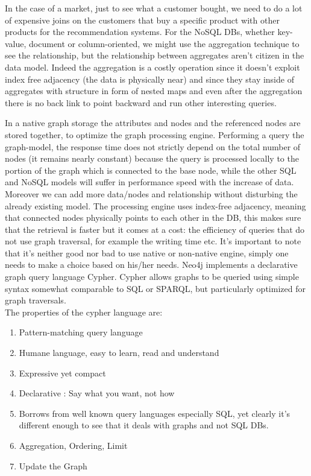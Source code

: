 \documentclass[a4page, 11pt]{article}
\begin{document}
In the case of a market, just to see what a customer bought, we need to do a lot of expensive joins on the customers that buy a specific product with other products for the recommendation systems. 
For the NoSQL DBs, whether key-value, document or column-oriented, we might use the aggregation technique to see the relationship, but the relationship between aggregates aren't citizen in the data model. Indeed the aggregation is a costly operation since it doesn't exploit index free adjacency (the data is physically near) and since they stay inside of aggregates with structure in form of nested maps and even after the aggregation there is no back link to point backward and run
other interesting queries. 

In a native graph storage the attributes and nodes and the referenced nodes are stored together, to optimize the graph processing engine. 
Performing a query the graph-model, the response time does not strictly depend on the total number of nodes (it remains nearly constant) because the query is processed locally to the portion of the graph which is connected to the base node, while the other SQL and NoSQL models will suffer in performance speed with the increase of data. 
Moreover we can add more data/nodes and relationship without disturbing the already existing model.
\newline
The processing engine uses index-free adjacency, meaning that connected nodes physically points to each other in the DB, this makes sure that the retrieval is faster but it comes at a cost: the efficiency of queries that do not use graph traversal, for example the writing time etc.
\newline
It's important to note that it's neither good nor bad to use native or non-native engine, simply one needs to make a choice based on his/her needs. %
\newline
Neo4j implements a declarative graph query language Cypher. Cypher allows graphs to be queried using simple syntax somewhat comparable to SQL or SPARQL, but particularly optimized for graph traversals.\\
The properties of the cypher language are:

\begin{enumerate}[noitemsep]
	 
	\item
	Pattern-matching query language
	\item
	Humane language, easy to learn, read and understand
	\item
	Expressive yet compact
	\item
	Declarative : Say what you want, not how
	\item
	Borrows from well known query languages especially SQL, yet clearly it's different enough to see that it deals with graphs and not SQL	DBs.
	\item
	Aggregation, Ordering, Limit
	\item
	Update the Graph
\end{enumerate}
\end{document}
